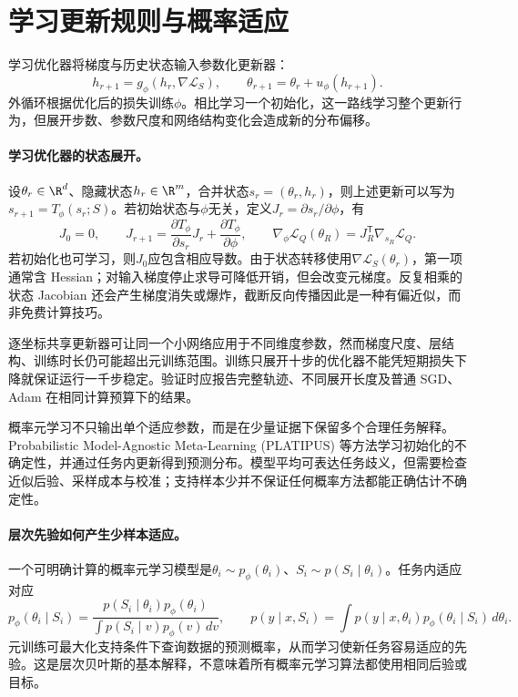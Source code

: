 \section{学习更新规则与概率适应}
学习优化器将梯度与历史状态输入参数化更新器：
\begin{equation}
 h_{r+1}=g_\phi(h_r,\nabla\mathcal L_S),\qquad
 \theta_{r+1}=\theta_r+u_\phi(h_{r+1}).
\end{equation}
外循环根据优化后的损失训练$\phi$\cite{andrychowicz2016optimizer}。相比学习一个初始化，这一路线学习整个更新行为，但展开步数、参数尺度和网络结构变化会造成新的分布偏移。

\paragraph{学习优化器的状态展开。}
设$\theta_r\in\R^d$、隐藏状态$h_r\in\R^m$，合并状态$s_r=(\theta_r,h_r)$，则上述更新可以写为$s_{r+1}=T_\phi(s_r;S)$。若初始状态与$\phi$无关，定义$J_r=\partial s_r/\partial\phi$，有
\begin{equation}
 J_0=0,\qquad
 J_{r+1}=\frac{\partial T_\phi}{\partial s_r}J_r
 +\frac{\partial T_\phi}{\partial\phi},\qquad
 \nabla_\phi\mathcal L_Q(\theta_R)
 =J_R^{\mathsf T}\nabla_{s_R}\mathcal L_Q.
\end{equation}
若初始化也可学习，则$J_0$应包含相应导数。由于状态转移使用$\nabla\mathcal L_S(\theta_r)$，第一项通常含 Hessian；对输入梯度停止求导可降低开销，但会改变元梯度。反复相乘的状态 Jacobian 还会产生梯度消失或爆炸，截断反向传播因此是一种有偏近似，而非免费计算技巧。

逐坐标共享更新器可让同一个小网络应用于不同维度参数，然而梯度尺度、层结构、训练时长仍可能超出元训练范围。训练只展开十步的优化器不能凭短期损失下降就保证运行一千步稳定。验证时应报告完整轨迹、不同展开长度及普通 SGD、Adam 在相同计算预算下的结果。

概率元学习不只输出单个适应参数，而是在少量证据下保留多个合理任务解释。Probabilistic Model-Agnostic Meta-Learning (PLATIPUS) 等方法学习初始化的不确定性，并通过任务内更新得到预测分布\cite{finn2018platipus}。模型平均可表达任务歧义，但需要检查近似后验、采样成本与校准；支持样本少并不保证任何概率方法都能正确估计不确定性。

\paragraph{层次先验如何产生少样本适应。}
一个可明确计算的概率元学习模型是$\theta_i\sim p_\phi(\theta_i)$、$S_i\sim p(S_i\mid\theta_i)$。任务内适应对应
\begin{equation}
 p_\phi(\theta_i\mid S_i)
 =\frac{p(S_i\mid\theta_i)p_\phi(\theta_i)}
 {\int p(S_i\mid v)p_\phi(v)\,dv},\qquad
 p(y\mid x,S_i)=\int p(y\mid x,\theta_i)p_\phi(\theta_i\mid S_i)\,d\theta_i.
\end{equation}
元训练可最大化支持条件下查询数据的预测概率，从而学习使新任务容易适应的先验。这是层次贝叶斯的基本解释，不意味着所有概率元学习算法都使用相同后验或目标。

